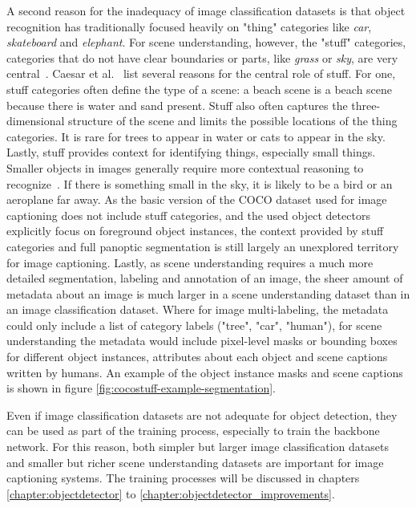 \documentclass[english,twoside,openright]{HYgraduMLDS}
\begin{document}
A second reason for the inadequacy of image classification datasets is that object recognition has traditionally focused heavily on "thing" categories like \textit{car}, \textit{skateboard} and \textit{elephant}. For scene understanding, however, the "stuff" categories, categories that do not have clear boundaries or parts, like \textit{grass} or \textit{sky}, are very central~\cite{CocoStuff}. Caesar et al.~\cite{CocoStuff} list several reasons for the central role of stuff. For one, stuff categories often define the type of a scene: a beach scene is a beach scene because there is water and sand present. Stuff also often captures the three-dimensional structure of the scene and limits the possible locations of the thing categories. It is rare for trees to appear in water or cats to appear in the sky. Lastly, stuff provides context for identifying things, especially small things. Smaller objects in images generally require more contextual reasoning to recognize~\cite{Coco}. If there is something small in the sky, it is likely to be a bird or an aeroplane far away. As the basic version of the COCO dataset used for image captioning does not include stuff categories, and the used object detectors explicitly focus on foreground object instances, the context provided by stuff categories and full panoptic segmentation is still largely an unexplored territory for image captioning.  
Lastly, as scene understanding requires a much more detailed segmentation, labeling and annotation of an image, the sheer amount of metadata about an image is much larger in a scene understanding dataset than in an image classification dataset. Where for image multi-labeling, the metadata could only include a list of category labels ("tree", "car", "human"), for scene understanding the metadata would include pixel-level masks or bounding boxes for different object instances, attributes about each object and scene captions written by humans. An example of the object instance masks and scene captions is shown in figure \ref{fig:cocostuff-example-segmentation}.

Even if image classification datasets are not adequate for object detection, they can be used as part of the training process, especially to train the backbone network. For this reason, both simpler but larger image classification datasets and smaller but richer scene understanding datasets are important for image captioning systems. The training processes will be discussed in chapters \ref{chapter:objectdetector} to \ref{chapter:objectdetector_improvements}.
\end{document}
